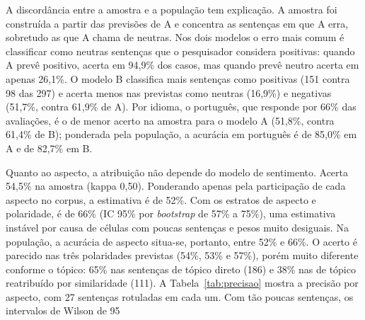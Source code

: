 \begin{table}[htb]
\centering
\caption{Sentimento: desempenho dos modelos A e B nas 297 sentenças rotuladas.}
\small
{}
\label{tab:rotuladas}
\end{table}

A discordância entre a amostra e a população tem explicação. A amostra foi construída a partir das previsões de A e concentra as sentenças em que A erra, sobretudo as que A chama de neutras. Nos dois modelos o erro mais comum é classificar como neutras sentenças que o pesquisador considera positivas: quando A prevê positivo, acerta em 94,9\% dos casos, mas quando prevê neutro acerta em apenas 26,1\%. O modelo B classifica mais sentenças como positivas (151 contra 98 das 297) e acerta menos nas previstas como neutras (16,9\%) e negativas (51,7\%, contra 61,9\% de A). Por idioma, o português, que responde por 66\% das avaliações, é o de menor acerto na amostra para o modelo A (51,8\%, contra 61,4\% de B); ponderada pela população, a acurácia em português é de 85,0\% em A e de 82,7\% em B.

Quanto ao aspecto, a atribuição não depende do modelo de sentimento. Acerta 54,5\% na amostra (kappa 0,50). Ponderando apenas pela participação de cada aspecto no corpus, a estimativa é de 52\%. Com os estratos de aspecto e polaridade, é de 66\% (IC 95\% por \textit{bootstrap} de 57\% a 75\%), uma estimativa instável por causa de células com poucas sentenças e pesos muito desiguais. Na população, a acurácia de aspecto situa-se, portanto, entre 52\% e 66\%. O acerto é parecido nas três polaridades previstas (54\%, 53\% e 57\%), porém muito diferente conforme o tópico: 65\% nas sentenças de tópico direto (186) e 38\% nas de tópico reatribuído por similaridade (111). A Tabela~\ref{tab:precisao} mostra a precisão por aspecto, com 27 sentenças rotuladas em cada um. Com tão poucas sentenças, os intervalos de Wilson de 95%

